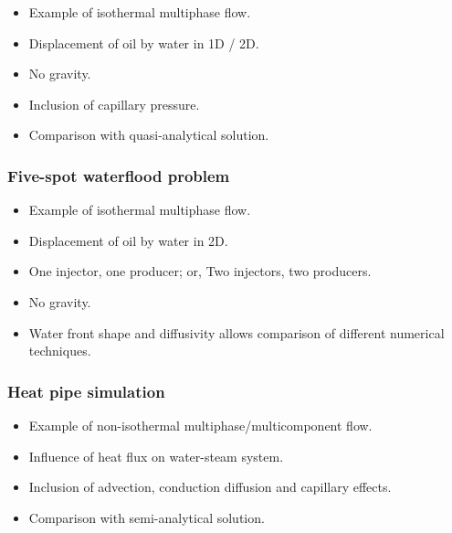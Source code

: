 \begin{itemize}
\item Example of isothermal multiphase flow.
\item Displacement of oil by water in 1D / 2D.
\item No gravity.
\item Inclusion of capillary pressure.
\item Comparison with quasi-analytical solution.
\end{itemize}

\subsubsection{Five-spot waterflood problem}

\begin{itemize}
\item Example of isothermal multiphase flow.
\item Displacement of oil by water in 2D.
\item One injector, one producer; or, Two injectors, two producers.
\item No gravity.
\item Water front shape and diffusivity allows comparison of different numerical techniques.
\end{itemize}

\subsubsection{Heat pipe simulation}

\begin{itemize}
\item Example of non-isothermal multiphase/multicomponent flow.
\item Influence of heat flux on water-steam system.
\item Inclusion of advection, conduction diffusion and capillary effects.
\item Comparison with semi-analytical solution.
\end{itemize}
